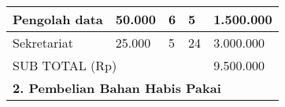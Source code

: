 \begin{table}[H]
{\begin{tabular}{|lllll|}
			\multicolumn{1}{|l|}{Pengolah data}                                                                          & \multicolumn{1}{l|}{50.000}                                                                                                                             & \multicolumn{1}{l|}{6}                                                             & \multicolumn{1}{l|}{5}                                                               & 1.500.000                                                                                         \\ \hline
			\multicolumn{1}{|l|}{Sekretariat}                                                                            & \multicolumn{1}{l|}{25.000}                                                                                                                             & \multicolumn{1}{l|}{5}                                                             & \multicolumn{1}{l|}{24}                                                              & 3.000.000                                                                                         \\ \hline
			\multicolumn{4}{|l|}{SUB TOTAL (Rp)}                                                                                                                                                                                                                                                                                                                                                                                                               & 9.500.000                                                                                         \\ \hline
			\multicolumn{5}{|l|}{\textbf{2. Pembelian Bahan Habis Pakai}}                                                                                                                                                                                                                                                                                                                                                                                                                                                                                          \\ \hline

\end{tabular}}
\end{table}

